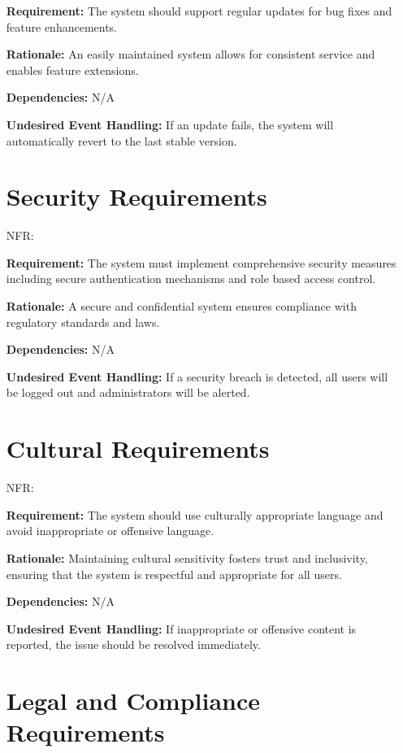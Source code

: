 \documentclass[12pt]{article}
\newcounter{nfrnum} %
\begin{document}
\begin{itemize}
\textbf{Requirement:} The system should support regular updates for bug fixes and feature enhancements.

\textbf{Rationale:} An easily maintained system allows for consistent service and enables feature extensions.

\textbf{Dependencies:} N/A

\textbf{Undesired Event Handling:} If an update fails, the system will automatically revert to the last stable version.

\section{Security Requirements} \label{NFR_Security}

\item[NFR\refstepcounter{nfrnum}\thenfrnum \label{NFR_Security}:] 

\textbf{Requirement:} The system must implement comprehensive security measures including secure authentication mechanisms and role based access control.

\textbf{Rationale:} A secure and confidential system ensures compliance with regulatory standards and laws. 

\textbf{Dependencies:} N/A

\textbf{Undesired Event Handling:} If a security breach is detected, all users will be logged out and administrators will be alerted.

\section{Cultural Requirements}

\item[NFR\refstepcounter{nfrnum}\thenfrnum \label{NFR_Cultural}:] 

\textbf{Requirement:} The system should use culturally appropriate language and avoid inappropriate or offensive language.
    
\textbf{Rationale:} Maintaining cultural sensitivity fosters trust and inclusivity, ensuring that the system is respectful and appropriate for all users.
    
\textbf{Dependencies:} N/A
    
\textbf{Undesired Event Handling:} If inappropriate or offensive content is reported, the issue should be resolved immediately.

\section{Legal and Compliance Requirements}


\end{itemize}
\end{document}
